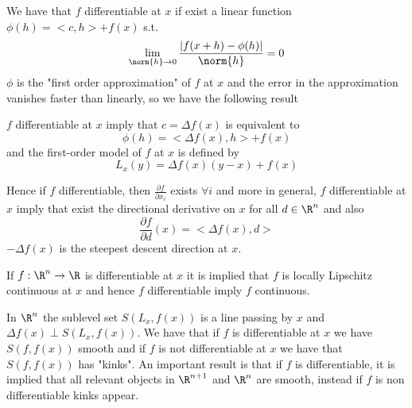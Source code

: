 We have that $f$ differentiable at $x$ if exist a linear function $\phi(h) = <c, h> + f(x)$ s.t.
\[ \lim _{\norm{h} \to 0} \frac{|f(x+h) - \phi(h)|}{\norm{h}} = 0 \]
$\phi$ is the "first order approximation" of $f$ at $x$ and the error in the approximation
vanishes faster than linearly, so we have the following result
\begin{thm}
    $f$ differentiable at $x$ imply that $c = \Delta f(x)$ is equivalent to 
    \[ \phi(h) = <\Delta f(x), h> + f(x) \] 
    and the first-order model of $f$ at $x$ is defined by
    \[ L_x(y) = \Delta f(x) (y - x) + f(x) \]
\end{thm}
Hence if $f$ differentiable, then $\frac{\partial f}{\partial x_i}$ exists $\forall i$ and more 
in general, $f$ differentiable at $x$ imply that exist the directional derivative on $x$ for all
$d \in \R^n$ and also 
\[ \frac{\partial f}{\partial d}(x) = <\Delta f(x), d> \]
$-\Delta f(x)$ is the steepest descent direction at $x$.

If $f:\R^n \to \R$ is differentiable at $x$ it is implied that $f$ is locally Lipschitz continuous
at $x$ and hence $f$ differentiable imply $f$ continuous.

In $\R^n$ the sublevel set $S(L_x, f(x))$ is a line passing by $x$ and 
$\Delta f(x) \perp S(L_x, f(x))$.\newline
We have that if $f$ is differentiable at $x$ we have $S(f, f(x))$ smooth and if $f$ is not 
differentiable at $x$ we have that $S(f, f(x))$ has "kinks".\newline
An important result is that if $f$ is differentiable, it is implied that all relevant objects
in $\R^{n+1}$ and $\R^n$ are smooth, instead if $f$ is non differentiable kinks appear.

